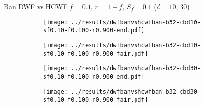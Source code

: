 \documentclass[8pt,a4paper]{beamer}
\begin{document}
	
	

	\begin{frame}{Ban DWF vs HCWF $f=0.1,\, r=1-f,\,S_f=0.1$ ($d=10,\, 30$)}
		\begin{figure}
			\begin{subfigure}{.48\textwidth}
				\centering
				\texttt{[image: ../results/dwfbanvshcwfban-b32-cbd10-sf0.10-f0.100-r0.900-end.pdf]}
			\end{subfigure}
			\begin{subfigure}{.48\textwidth}
				\centering
				\texttt{[image: ../results/dwfbanvshcwfban-b32-cbd10-sf0.10-f0.100-r0.900-fair.pdf]}
			\end{subfigure}
		\end{figure}
		
		\begin{figure}
			\begin{subfigure}{.48\textwidth}
				\centering
				\texttt{[image: ../results/dwfbanvshcwfban-b32-cbd30-sf0.10-f0.100-r0.900-end.pdf]}
			\end{subfigure}
			\begin{subfigure}{.48\textwidth}
				\centering
				\texttt{[image: ../results/dwfbanvshcwfban-b32-cbd30-sf0.10-f0.100-r0.900-fair.pdf]}
			\end{subfigure}
		\end{figure}
	\end{frame}
\end{document}
